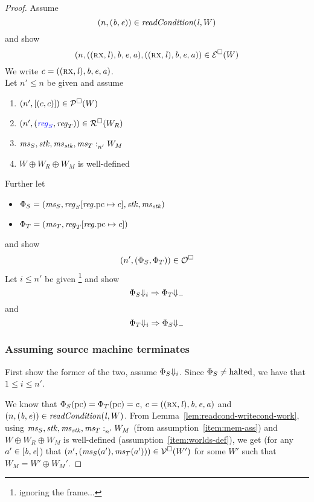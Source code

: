 \documentclass[a4paper]{article}
\begin{document}
\begin{proof}
  Assume
\[
  \npair{(\baddr,\eaddr)}\in \readCond{\lin,W}
\]
and show
\[
\npair{((\rx,\lin),\baddr,\eaddr,\aaddr),
       ((\rx,\lin),\baddr,\eaddr,\aaddr)} \in \lre(W)
\]
We write $c=((\rx,\lin),\baddr,\eaddr,\aaddr)$.\\

Let $n' \leq n$ be given and assume
\begin{enumerate}
\item $\npair[n']{[(c,c)]} \in \lrp(W)$ 
\item $\npair[n']{\stpair{\reg}{\reg}} \in \lrr(W_R)$ \label{item:reg-ass}
\item $\memSat[n']{\ms_S,\stk,\ms_\stk,\ms_T}{W_M}$\label{item:mem-ass}
\item $W \oplus W_R \oplus W_M$ is well-defined\label{item:worlds-def}
\end{enumerate}
Further let
\begin{itemize}
\item $\Phi_S = (\ms_S,\reg_S\updReg{\pcreg}{c},\stk,\ms_\stk)$
\item $\Phi_T = (\ms_T,\reg_T\updReg{\pcreg}{c})$
\end{itemize}
and show
\[
  \npair[n']{(\Phi_S,\Phi_T)} \in \lro
\]
Let $i \leq n'$ be given \footnote{ignoring the frame...} and show
\[
  \Phi_S \term[i] \Rightarrow \Phi_T \term
\]
and 
\[
  \Phi_T \term[i] \Rightarrow \Phi_S \term
\]

\subsubsection*{Assuming source machine terminates}
First show the former of the two, assume $\Phi_S\term[i]$.
Since $\Phi_S \neq \halted$, we have that $1 \leq i \leq n'$.

We know that $\Phi_S(\pcreg) = \Phi_T(\pcreg) = c$, $c=((\rx,\lin),\baddr,\eaddr,\aaddr)$ and $\npair{(\baddr,\eaddr)}\in \readCond{\lin,W}$.
From Lemma~\ref{lem:readcond-writecond-work}, using $\memSat[n']{\ms_S,\stk,\ms_\stk,\ms_T}{W_M}$ (from assumption~\ref{item:mem-ass}) and $W \oplus W_R \oplus W_M$ is well-defined (assumption~\ref{item:worlds-def}), we get (for any $a' \in [\baddr,\eaddr]$) that $\npair[n']{(\ms_S(a'),\ms_T(a'))} \in \lrv(W')$ for some $W'$ such that $W_M = W' \oplus W_M'$.


\end{proof}
\end{document}
